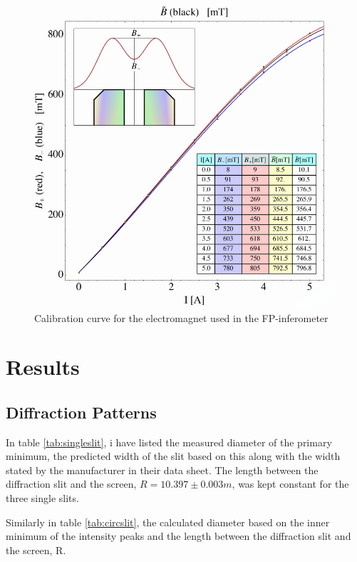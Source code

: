 \documentclass[11pt,a4paper]{article}
\begin{document}
      \begin{figure}[H]
        \center
        \includegraphics[width=15cm]{scripts/figs/B_calibration_curve.png}
        \caption{Calibration curve for the electromagnet used in the FP-inferometer}
        \label{fig:cali_curve}
      \end{figure}


\section{\label{sect:results}Results}
    \subsection{Diffraction Patterns\label{sect:patterns}}

    In table \ref{tab:singleslit}, i have listed the measured diameter of the primary minimum, the predicted width of the slit based on this along with the width stated by the manufacturer in their data sheet. The length between the diffraction slit and the screen, $R=10.397\pm 0.003m $, was kept constant for the three single slits.

    Similarly in table \ref{tab:circslit}, the calculated diameter based on the inner minimum of the intensity peaks and the length between the diffraction slit and the screen, R.
\end{document}

